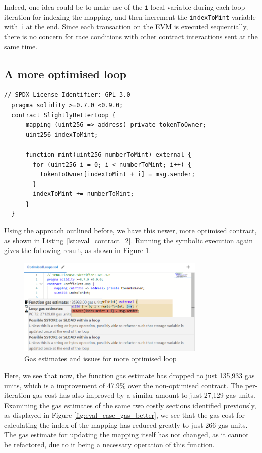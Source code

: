 Indeed, one idea could be to make use of the \texttt{i} local variable during each loop iteration
for indexing the mapping, and then increment the \texttt{indexToMint} variable with \texttt{i} 
at the end. Since each transaction on the EVM is executed sequentially, there is no concern
for race conditions with other contract interactions sent at the same time.


\subsection{A more optimised loop}

\begin{lstlisting}[language=Solidity, caption={A more optimised loop contract}, label={lst:eval_contract_2}, basicstyle=\ttfamily\scriptsize]
  // SPDX-License-Identifier: GPL-3.0
  pragma solidity >=0.7.0 <0.9.0;
  contract SlightlyBetterLoop {
      mapping (uint256 => address) private tokenToOwner;
      uint256 indexToMint;

      function mint(uint256 numberToMint) external {
        for (uint256 i = 0; i < numberToMint; i++) {
          tokenToOwner[indexToMint + i] = msg.sender;
        }
        indexToMint += numberToMint;
      }
  }
\end{lstlisting}

Using the approach outlined before, we have this newer, more optimised contract,
as shown in Listing \ref{lst:eval_contract_2}. Running the symbolic execution again gives
the following result, as shown in Figure \ref{fig:eval_case_issues_better}.

\begin{figure}[h]
  \centering
  \includegraphics[width=0.8\textwidth]{./figures/eval/case_issues_better}
  \caption{Gas estimates and issues for more optimised loop}
  \label{fig:eval_case_issues_better}
\end{figure}

Here, we see that now, the function gas estimate has dropped to just 135,933 gas units,
which is a improvement of 47.9\% over the non-optimised contract. The per-iteration gas
cost has also improved by a similar amount to just 27,129 gas units. Examining the
gas estimates of the same two costly sections identified previously, as displayed
in Figure \ref{fig:eval_case_gas_better}, we see that the gas cost for
calculating the index of the mapping has reduced greatly to just 266 gas units.
The gas estimate for updating the mapping itself has not changed, as it cannot be
refactored, due to it being a necessary operation of this function.

